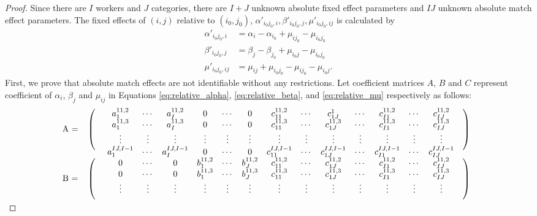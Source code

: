 \documentclass[12pt]{article}
\begin{document}
\begin{proof}
    Since there are $I$ workers and $J$ categories, there are $I+J$ unknown absolute fixed effect parameters and $IJ$ unknown absolute match effect parameters. The fixed effects of $(i,j)$ relative to $(i_0,j_0)$, $\alpha'_{i_0j_0,i},\beta'_{i_0j_0,j},\mu'_{i_0j_0,ij}$ is calculated by 
    \begin{align}
        \alpha'_{i_0j_0,i} &= \alpha_i-\alpha_{i_0}+\mu_{ij_0}-\mu_{i_0j_0}\label{eq:relative_alpha} \\
        \beta'_{i_0j_0,j} &= \beta_j-\beta_{j_0}+\mu_{i_0j}-\mu_{i_0j_0} \label{eq:relative_beta} \\
        \mu'_{i_0j_0,ij} &= \mu_{ij}+\mu_{i_0j_0}-\mu_{ij_0}-\mu_{i_0j}. \label{eq:relative_mu} 
    \end{align}
    First, we prove that absolute match effects are not identifiable without any restrictions.
    Let coefficient matrices $A$, $B$ and $C$ represent coefficient of $\alpha_i$, $\beta_j$ and $\mu_{ij}$ in Equations \eqref{eq:relative_alpha}, \eqref{eq:relative_beta}, and \eqref{eq:relative_mu} respectively as follows:
    \arraycolsep=4pt
    \begin{equation*}
        \begin{array}{crcccccccccccccl}
            \multirow{4}{*}{A\ =}&\ldelim({4}{14pt}[] & a^{11,2}_{1} & \cdots & a^{11,2}_{I} & 0 & \cdots & 0 & c^{11,2}_{11} & \cdots & c^1_{1J} & \cdots & c^{11,2}_{I1} & \cdots & c^{11,2}_{IJ} & \rdelim){4}{14pt}[] \\
            && a^{11,3}_{1} & \cdots & a^{11,3}_{I} & 0 & \cdots & 0 &c^{11,3}_{11} & \cdots & c^{11,3}_{1J} & \cdots & c^{11,3}_{I1} & \cdots & c^{11,3}_{IJ} & \\
            && \vdots & \vdots & \vdots & \vdots & \vdots & \vdots & \vdots & \vdots &\vdots & \vdots & \vdots & \vdots & \vdots &\\
            && a^{IJ,I-1}_{1} & \cdots & a^{IJ,I-1}_{I} & 0 & \cdots & 0 &c^{IJ,I-1}_{11} & \cdots & c^{IJ,I-1}_{1J} & \cdots & c^{IJ,I-1}_{I1} & \cdots & c^{IJ,I-1}_{IJ} &\\
            \multirow{4}{*}{B\ =}&\ldelim({4}{14pt}[] & 0 & \cdots & 0 & b^{11,2}_{1} & \cdots & b^{11,2}_{J} & c^{11,2}_{11} & \cdots & c^{11,2}_{1J}  & \cdots & c^{11,2}_{I1} & \cdots & c^{11,2}_{IJ} & \rdelim){4}{14pt}[] \\
            && 0 & \cdots & 0 & b^{11,3}_{1} & \cdots & b^{11,3}_{J} &c^{11,3}_{11} & \cdots & c^{11,3}_{1J}  & \cdots & c^{11,3}_{I1} & \cdots & c^{11,3}_{IJ} & \\
            && \vdots & \vdots & \vdots & \vdots & \vdots & \vdots & \vdots & \vdots & \vdots &\vdots & \vdots & \vdots & \vdots &\\

\end{array}
\end{equation*}
\end{proof}
\end{document}
